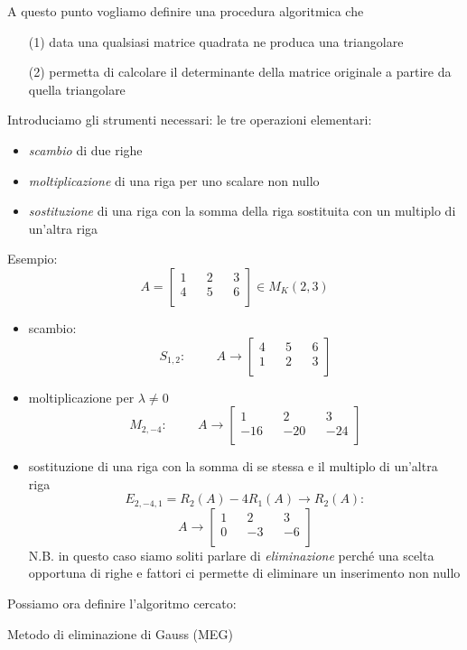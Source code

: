 \documentclass[a4paper, 12pt]{article}
\theoremstyle{definition}
\begin{document}
\noindent A questo punto vogliamo definire una procedura algoritmica che 
\begin{itemize}
    \item[(1)] data una qualsiasi matrice quadrata ne produca una triangolare
    \item[(2)] permetta di calcolare il determinante della matrice originale a partire da quella triangolare
\end{itemize}
Introduciamo gli strumenti necessari: le tre operazioni elementari:
\begin{itemize}
    \item \textit{scambio} di due righe
    \item \textit{moltiplicazione} di una riga per uno scalare non nullo
    \item \textit{sostituzione} di una riga con la somma della riga sostituita con un multiplo di un'altra riga
\end{itemize}
\newpage
\noindent Esempio:
\[
A = 
 \begin{bmatrix}
    1 && 2 && 3 \\
    4 && 5 && 6 \\
 \end{bmatrix}  
 \in{M_{K}(2,3)} 
\]
\begin{itemize}
    \item scambio:
        \[
            S_{1,2}: \hspace{1cm} A \longrightarrow 
         \begin{bmatrix}
            4 && 5 && 6 \\
            1 && 2 && 3 \\
         \end{bmatrix}   
        \]
    \item moltiplicazione per $\lambda \neq 0$
         \[
         M_{2,-4}: \hspace{1cm} A \longrightarrow
         \begin{bmatrix}
            1 && 2 && 3 \\
            -16 && -20 && -24 \\
         \end{bmatrix}   
         \]
    \item sostituzione di una riga con la somma di se stessa e il multiplo di un'altra riga
         \[
            E_{2,-4,1} = R_2(A) - 4R_1(A) \rightarrow R_2(A): 
        \]
        \[
            A \longrightarrow 
            \begin{bmatrix}
                1 && 2 && 3 \\
                0 && -3 && -6 \\
            \end{bmatrix}
         \]
    N.B. in questo caso siamo soliti parlare di \textit{eliminazione} perché una scelta opportuna di righe e fattori ci permette di eliminare un inserimento non nullo
\end{itemize}
\vspace{1cm}

Possiamo ora definire l'algoritmo cercato:
\begin{center}
Metodo di eliminazione di Gauss (MEG)
\end{center}
\end{document}
